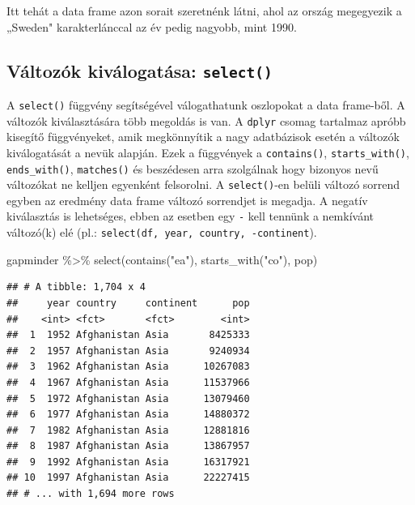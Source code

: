 \documentclass[
]{book}
\newenvironment{Shaded}{\begin{snugshade}}{\end{snugshade}}
\newcommand{\FunctionTok}[1]{\textcolor[rgb]{0.00,0.00,0.00}{#1}}
\newcommand{\NormalTok}[1]{#1}
\newcommand{\SpecialCharTok}[1]{\textcolor[rgb]{0.00,0.00,0.00}{#1}}
\newcommand{\StringTok}[1]{\textcolor[rgb]{0.31,0.60,0.02}{#1}}
\begin{document}
Itt tehát a data frame azon sorait szeretnénk látni, ahol az ország
megegyezik a „Sweden" karakterlánccal az év pedig nagyobb, mint 1990.

\hypertarget{vuxe1ltozuxf3k-kivuxe1logatuxe1sa-select}{%
\subsection{\texorpdfstring{Változók kiválogatása:
\texttt{select()}}{Változók kiválogatása: select()}}\label{vuxe1ltozuxf3k-kivuxe1logatuxe1sa-select}}

A \texttt{select()} függvény segítségével válogathatunk oszlopokat a
data frame-ből. A változók kiválasztására több megoldás is van. A
\texttt{dplyr} csomag tartalmaz apróbb kisegítő függvényeket, amik
megkönnyítik a nagy adatbázisok esetén a változók kiválogatását a nevük
alapján. Ezek a függvények a \texttt{contains()},
\texttt{starts\_with()}, \texttt{ends\_with()}, \texttt{matches()} és
beszédesen arra szolgálnak hogy bizonyos nevű változókat ne kelljen
egyenként felsorolni. A \texttt{select()}-en belüli változó sorrend
egyben az eredmény data frame változó sorrendjet is megadja. A negatív
kiválasztás is lehetséges, ebben az esetben egy \texttt{-} kell tennünk
a nemkívánt változó(k) elé (pl.:
\texttt{select(df,\ year,\ country,\ -continent}).

\begin{Shaded}
\begin{Highlighting}[]
\NormalTok{gapminder }\SpecialCharTok{\%\textgreater{}\%} 
  \FunctionTok{select}\NormalTok{(}\FunctionTok{contains}\NormalTok{(}\StringTok{"ea"}\NormalTok{), }\FunctionTok{starts\_with}\NormalTok{(}\StringTok{"co"}\NormalTok{), pop)}
\end{Highlighting}
\end{Shaded}

\begin{verbatim}
## # A tibble: 1,704 x 4
##     year country     continent      pop
##    <int> <fct>       <fct>        <int>
##  1  1952 Afghanistan Asia       8425333
##  2  1957 Afghanistan Asia       9240934
##  3  1962 Afghanistan Asia      10267083
##  4  1967 Afghanistan Asia      11537966
##  5  1972 Afghanistan Asia      13079460
##  6  1977 Afghanistan Asia      14880372
##  7  1982 Afghanistan Asia      12881816
##  8  1987 Afghanistan Asia      13867957
##  9  1992 Afghanistan Asia      16317921
## 10  1997 Afghanistan Asia      22227415
## # ... with 1,694 more rows
\end{verbatim}
\end{document}
